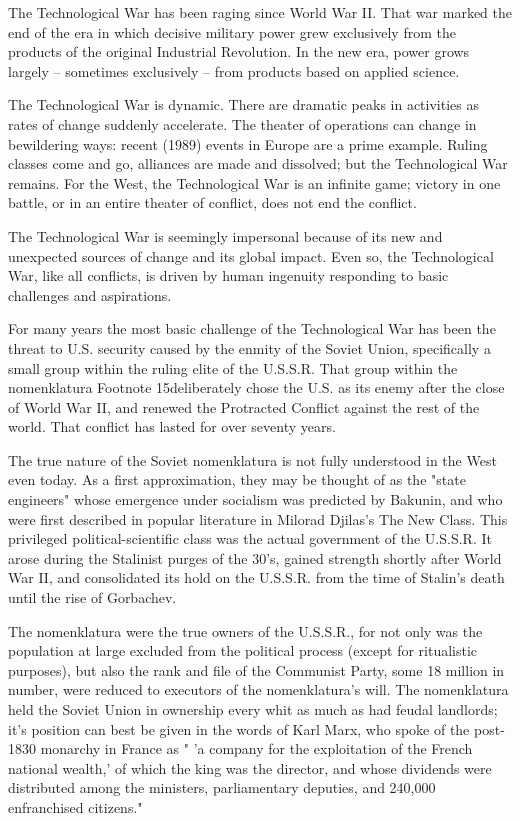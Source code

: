 \documentclass[a4paper,12pt]{book}
\begin{document}
The Technological War has been raging since World War II. That war marked the end of the era in which decisive military power grew exclusively from the products of the original Industrial Revolution. In the new era, power grows largely -- sometimes exclusively -- from products based on applied science.

The Technological War is dynamic. There are dramatic peaks in activities as rates of change suddenly accelerate. The theater of operations can change in bewildering ways: recent (1989) events in Europe are a prime example. Ruling classes come and go, alliances are made and dissolved; but the Technological War remains. For the West, the Technological War is an infinite game; victory in one battle, or in an entire theater of conflict, does not end the conflict.

The Technological War is seemingly impersonal because of its new and unexpected sources of change and its global impact. Even so, the Technological War, like all conflicts, is driven by human ingenuity responding to basic challenges and aspirations.

For many years the most basic challenge of the Technological War has been the threat to U.S. security caused by the enmity of the Soviet Union, specifically a small group within the ruling elite of the U.S.S.R. That group within the nomenklatura Footnote 15deliberately chose the U.S. as its enemy after the close of World War II, and renewed the Protracted Conflict against the rest of the world. That conflict has lasted for over seventy years.

The true nature of the Soviet nomenklatura is not fully understood in the West even today. As a first approximation, they may be thought of as the "state engineers" whose emergence under socialism was predicted by Bakunin, and who were first described in popular literature in Milorad Djilas's The New Class. This privileged political-scientific class was the actual government of the U.S.S.R. It arose during the Stalinist purges of the 30's, gained strength shortly after World War II, and consolidated its hold on the U.S.S.R. from the time of Stalin's death until the rise of Gorbachev.

The nomenklatura were the true owners of the U.S.S.R., for not only was the population at large excluded from the political process (except for ritualistic purposes), but also the rank and file of the Communist Party, some 18 million in number, were reduced to executors of the nomenklatura's will. The nomenklatura held the Soviet Union in ownership every whit as much as had feudal landlords; it's position can best be given in the words of Karl Marx, who spoke of the post-1830 monarchy in France as " 'a company for the exploitation of the French national wealth,' of which the king was the director, and whose dividends were distributed among the ministers, parliamentary deputies, and 240,000 enfranchised citizens."
\end{document}
